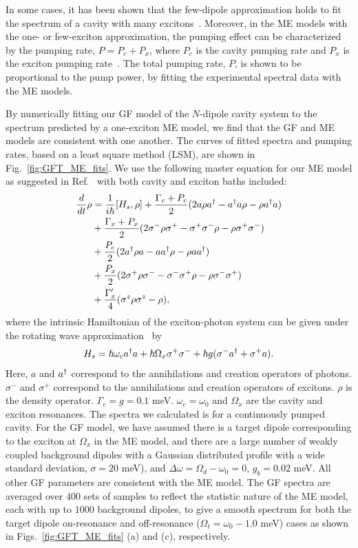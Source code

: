 In some cases, it has been shown that the few-dipole approximation holds to fit the spectrum of a cavity with many excitons~\cite{yao2010nonlinear,Reitzenstein2010}. Moreover, in the ME models with the one- or few-exciton approximation, the pumping effect can be characterized by the pumping rate, $P=P_c+P_x$, where $P_c$ is the cavity pumping rate and $P_x$ is the exciton pumping rate~\cite{yao2010nonlinear}. The total pumping rate, $P$, is shown to be proportional to the pump power, by fitting the experimental spectral data with the ME models.

By numerically fitting our GF model of the $N$-dipole cavity system to the spectrum predicted by a one-exciton ME model, we find that the GF and ME models are consistent with one another. The curves of fitted spectra and pumping rates, based on a least square method (LSM), are shown in Fig.~\ref{fig:GFT_ME_fits}. We use the following master equation for our ME model as suggested in Ref.~ with both cavity and exciton baths included:
\begin{equation}
\begin{split}
  \frac{d}{dt} \rho & = \frac{1}{i\hbar}[H_s,\rho] + \frac{\Gamma_c+P_c}{2}(2a\rho a^{\dagger} - a^{\dagger} a\rho - \rho a^{\dagger} a)\\
& +\frac{\Gamma_x+P_x}{2}(2\sigma^{-}\rho\sigma^{+} - \sigma^{+}\sigma^{-}\rho - \rho\sigma^{+}\sigma^{-} ) \\
& +\frac{P_c}{2}(2a^{\dagger}\rho a - a a^{\dagger}\rho - \rho aa^{\dagger}) \\
&+ \frac{P_x}{2} (2\sigma^{+}\rho\sigma^{-} - \sigma^{-}\sigma^{+}\rho - \rho\sigma^{-}\sigma^{+} )\\
&+\frac{\Gamma_x^{\prime}}{4} (\sigma^{z}\rho\sigma^{z}-\rho),
 \end{split}
\end{equation}
where the intrinsic Hamiltonian of the exciton-photon system can be given under the rotating wave approximation~\cite{Gerry2005} by
\begin{equation}
 H_s=\hbar\omega_c a^{\dagger} a+ \hbar \Omega_x \sigma^{+}\sigma^{-} +\hbar g(\sigma^{-} a^{\dagger}+\sigma^{+} a).
\end{equation}
Here, $a$ and $a^{\dagger}$ correspond to the annihilations and creation operators of photons. $\sigma^-$ and $\sigma^+$ correspond to the annihilations and creation operators of excitons. $\rho$ is the density operator. $\Gamma_c=g=0.1$ meV. $\omega_c=\omega_0$ and $\Omega_x$ are the cavity and exciton resonances. The spectra we calculated is for a continuously pumped cavity. For the GF model, we have assumed there is a target dipole corresponding to the exciton at $\Omega_x$ in the ME model, and there are a large number of weakly coupled background dipoles with a Gaussian distributed profile with a wide standard deviation, $\sigma=20$ meV), and $\Delta\omega=\Omega_d-\omega_0=0$, $g_b=0.02$ meV. All other GF parameters are consistent with the ME model. The GF spectra are averaged over $400$ sets of samples to reflect the statistic nature of the ME model, each with up to $1000$ background dipoles, to give a smooth spectrum for both the target dipole on-resonance and off-resonance ($\Omega_t=\omega_0-1.0$ meV) cases as shown in Figs.~\ref{fig:GFT_ME_fits} (a) and (c), respectively.


